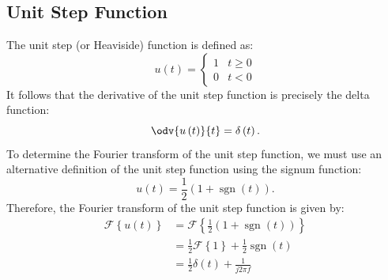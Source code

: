 \documentclass{article}
\DeclareMathOperator{\sgn}{sgn}
\begin{document}
\subsection{Unit Step Function}
The unit step (or Heaviside) function is defined as:
\begin{equation*}
    u\left( t \right) =
    \begin{cases}
        1 & t \geq 0 \\
        0 & t < 0
    \end{cases}
\end{equation*}
It follows that the derivative of the unit step function is precisely the delta function:
\begin{equation*}
    \odv{u\left( t \right)}{t} = \delta\left( t \right).
\end{equation*}
To determine the Fourier transform of the unit step function, we must use an alternative definition
of the unit step function using the signum function:
\begin{equation*}
    u\left( t \right) = \frac{1}{2} \left( 1 + \sgn\left( t \right) \right).
\end{equation*}
Therefore, the Fourier transform of the unit step function is given by:
\begin{align*}
    \mathscr{F}\left\{ u\left( t \right) \right\} & = \mathscr{F}\left\{ \frac{1}{2} \left( 1 + \sgn\left( t \right) \right) \right\} \\
                                                  & = \frac{1}{2} \mathscr{F}\left\{ 1 \right\} + \frac{1}{2} \sgn\left( t \right)    \\
                                                  & = \frac{1}{2} \delta\left( t \right) + \frac{1}{j 2 \pi f}
\end{align*}
\end{document}
